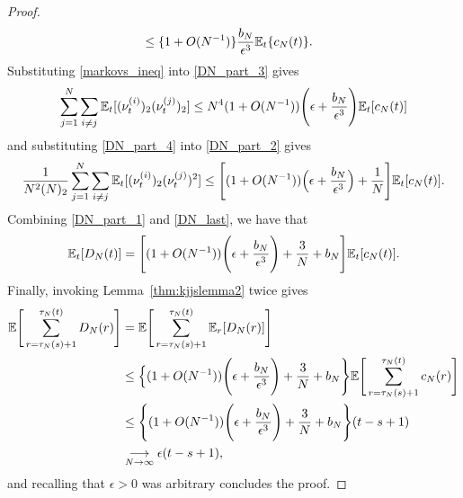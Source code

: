 \begin{proof}
\begin{align}
&\leq \{ 1 + O( N^{ -1 } ) \} \frac{ b_N }{ \epsilon^3 } \mathbb{E}_t\{ c_N( t )\}. 
\end{align}
Substituting \eqref{markovs_ineq} into \eqref{DN_part_3} gives
\begin{equation}
\sum_{ j=1 }^N \sum_{ i \neq j } \mathbb{E}_t[ ( \nu_t^{(i)} )_2 ( \nu_t^{(j)} )_2 ]
\leq N^4 (1 + O( N^{ -1 } ))
        \Bigg( \epsilon + \frac{ b_N }{ \epsilon^3 } \Bigg) \mathbb{E}_t[ c_N( t ) ] \label{DN_part_4}
\end{equation}
and substituting \eqref{DN_part_4} into \eqref{DN_part_2} gives
\begin{equation}
\frac{ 1 }{ N^2 ( N )_2 } \sum_{ j=1 }^N \sum_{ i \neq j } 
        \mathbb{E}_t[ ( \nu_t^{(i)} )_2 ( \nu_t^{(j)} )^2 ] 
\leq \Bigg[ ( 1 + O( N^{ -1 } ) )
        \Big( \epsilon + \frac{ b_N }{ \epsilon^3 } \Big) 
        + \frac{ 1 }{ N } \Bigg] \mathbb{E}_t[ c_N( t ) ]. \label{DN_last}
\end{equation}
Combining \eqref{DN_part_1} and \eqref{DN_last}, we have that
\begin{equation*}
\mathbb{E}_t[ D_N(t) ] 
= \Bigg[ (1 + O( N^{ -1 } )) \Bigg( \epsilon + \frac{ b_N }{ \epsilon^3 } \Bigg) 
        + \frac{ 3 }{ N } + b_N \Bigg] \mathbb{E}_t[ c_N(t) ] .
\end{equation*}
Finally, invoking Lemma~\ref{thm:kjjslemma2} twice gives
\begin{align*}
\mathbb{E}\Bigg[ \sum_{ r = \tau_N( s ) + 1 }^{ \tau_N( t ) } D_N( r ) \Bigg] 
&= \mathbb{E}\Bigg[ \sum_{ r = \tau_N( s ) + 1 }^{ \tau_N( t ) } \mathbb{E}_r[ D_N( r ) ] \Bigg] \\
&\leq \Big\{ (1 + O( N^{ -1 } )) 
        \Bigg( \epsilon + \frac{ b_N }{ \epsilon^3 } \Bigg) 
        + \frac{ 3 }{ N } + b_N \Bigg\}
        \mathbb{E}\Bigg[ \sum_{ r = \tau_N( s ) + 1 }^{ \tau_N( t ) } c_N( r ) \Bigg] \\
&\leq \Bigg\{ (1 + O( N^{ -1 } )) 
        \Bigg( \epsilon + \frac{ b_N }{ \epsilon^3 } \Bigg) 
        + \frac{ 3 }{ N } + b_N \Bigg\} ( t - s + 1 ) \\
& \underset{N\to\infty}{\longrightarrow} \epsilon ( t - s + 1 ),
\end{align*}
and recalling that $\epsilon > 0$ was arbitrary concludes the proof.
\end{proof}





